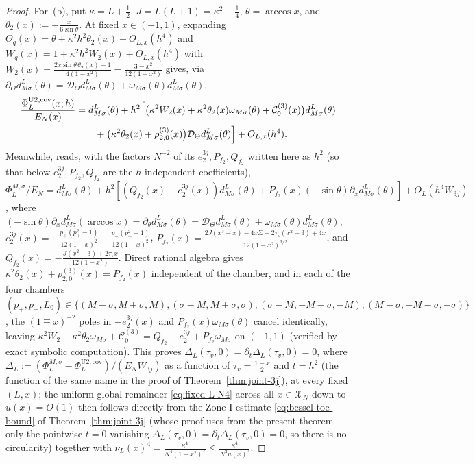 \documentclass[11pt]{article}
\theoremstyle{definition}
\theoremstyle{remark}
\newcommand{\cD}{\mathcal{D}}
\newcommand{\cC}{\mathcal{C}}
\newcommand{\cX}{\mathcal{X}}
\renewcommand{\_}{\oldunderscore\penalty0\hskip0pt\relax}
\begin{document}
\begin{proof}
For~(b), put $\kappa=L+\frac12$, $J=L(L+1)=\kappa^2-\frac14$, $\theta=\arccos x$, and $\theta_2(x):=-\frac{x}{6\sin\theta}$. At
  fixed $x\in(-1,1)$, expanding $\Theta_q(x)=\theta+\kappa^2 h^2\theta_2(x)+O_{L,x}(h^4)$ and $W_q(x)=1+\kappa^2 h^2
  W_2(x)+O_{L,x}(h^4)$ with $W_2(x)=\frac{2x\sin\theta\,\theta_2(x)+1}{4(1-x^2)}=\frac{3-x^2}{12(1-x^2)}$ gives, via
  $\partial_\Theta d^L_{M\sigma}(\theta)=\cD_\Theta d^L_{M\sigma}(\theta)+\omega_{M\sigma}(\theta)d^L_{M\sigma}(\theta)$,
\begin{equation}
  \begin{aligned}
  \frac{\Phi_L^{\mathrm{U2,cov}}(x;h)}{E_N(x)} &= d^L_{M\sigma}(\theta) + h^2\Bigl[\bigl(\kappa^2
    W_2(x)+\kappa^2\theta_2(x)\omega_{M\sigma}(\theta)+\cC_0^{(3)}(x)\bigr)d^L_{M\sigma}(\theta)\\
  &\qquad + \bigl(\kappa^2\theta_2(x)+\rho_{2,0}^{(3)}(x)\bigr)\cD_\Theta d^L_{M\sigma}(\theta)\Bigr] + O_{L,x}(h^4).
  \end{aligned}
\end{equation}
Meanwhile, \cite[Eq.~(261)]{LewisFixedRank} reads, with the factors $N^{-2}$ of its $e_2^{3j},P_{f_2},Q_{f_2}$ written here as $h^2$ (so that below $e_2^{3j},P_{f_2},Q_{f_2}$ are the $h$-independent coefficients),
  $\Phi_L^{M,\sigma}/E_N=d^L_{M\sigma}(\theta)+h^2[(Q_{f_2}(x)-e_2^{3j}(x))d^L_{M\sigma}(\theta)+P_{f_2}(x)(-\sin\theta)\partial_x
  d^L_{M\sigma}(\theta)]+O_L(h^4 W_{3j})$, where $(-\sin\theta)\partial_x d^L_{M\sigma}(\arccos x)=\partial_\theta
  d^L_{M\sigma}(\theta)=\cD_\Theta d^L_{M\sigma}(\theta)+\omega_{M\sigma}(\theta)d^L_{M\sigma}(\theta)$,
  $e_2^{3j}(x)=-\frac{p_+(p_+^2-1)}{12(1-x)^2}-\frac{p_-(p_-^2-1)}{12(1+x)^2}$,
  $P_{f_2}(x)=\frac{2J(x^3-x)-4x\Sigma+2\tau_\star(x^2+3)+4x}{12(1-x^2)^{3/2}}$, and $Q_{f_2}(x)=-\frac{J(x^2-3)+2\tau_\star
  x}{12(1-x^2)}$. Direct rational algebra gives $\kappa^2\theta_2(x)+\rho_{2,0}^{(3)}(x)=P_{f_2}(x)$ independent of the chamber,
  and in each of the four chambers
  $(p_+,p_-,L_0)\in\{(M-\sigma,M+\sigma,M),(\sigma-M,M+\sigma,\sigma),(\sigma-M,-M-\sigma,-M),(M-\sigma,-M-\sigma,-\sigma)\}$,
  the $(1\mp x)^{-2}$ poles in $-e_2^{3j}(x)$ and $P_{f_2}(x)\omega_{M\sigma}(\theta)$ cancel identically, leaving $\kappa^2
  W_2+\kappa^2\theta_2\omega_{M\sigma}+\cC_0^{(3)}=Q_{f_2}-e_2^{3j}+P_{f_2}\omega_{M\sigma}$ on $(-1,1)$
  (verified by exact symbolic computation). This proves $\Delta_L(\tau_v,0)=\partial_t\Delta_L(\tau_v,0)=0$, where $\Delta_L:=(\Phi_L^{M,\sigma}-\Phi_L^{\mathrm{U2,cov}})/(E_NW_{3j})$ as a function of $\tau_v=\frac{1-x}2$ and $t=h^2$ (the function of the same name in the proof of Theorem~\ref{thm:joint-3j}), at every fixed
  $(L,x)$; the uniform global remainder \eqref{eq:fixed-L-N4} across all $x\in\cX_N$ down to $u(x)=O(1)$ then follows directly
  from the Zone-I estimate \eqref{eq:bessel-toe-bound} of Theorem~\ref{thm:joint-3j} (whose proof uses from the present theorem
  only the pointwise $t=0$ vanishing $\Delta_L(\tau_v,0)=\partial_t\Delta_L(\tau_v,0)=0$, so there is no circularity) together with
  $\nu_L(x)^4=\frac{\kappa^4}{N^4(1-x^2)^2}\le\frac{\kappa^4}{N^2 u(x)^2}$.
\end{proof}
\end{document}
